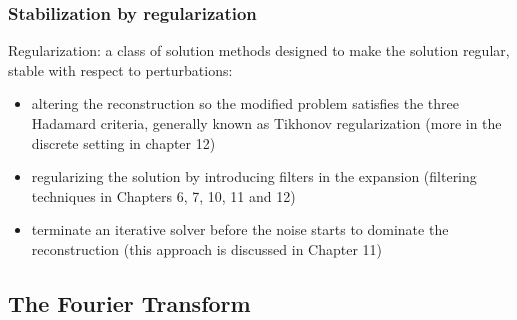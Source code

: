 \documentclass{beamer}
\begin{document}
\begin{frame}
	\frametitle{Stabilization by regularization}
	Regularization: a class of solution methods designed to make the solution regular, stable with respect to perturbations:
		 \pause
	\begin{itemize}
		\item altering the reconstruction so the modified problem satisfies the three Hadamard criteria, generally known as Tikhonov regularization (more in the discrete setting in chapter 12)
		 \pause
		\item regularizing the solution by introducing filters in the expansion (filtering techniques in Chapters 6, 7, 10, 11 and 12)
		 \pause
		\item terminate an iterative solver before the noise starts to dominate the reconstruction (this approach is discussed in Chapter 11)
		
	\end{itemize}
\end{frame}

\subsection{The Fourier Transform}
\end{document}
